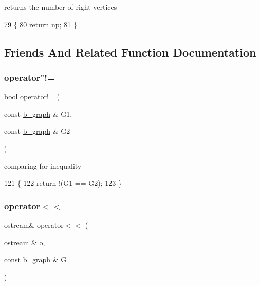 returns the number of right vertices 


\begin{DoxyCode}
79 \{
80   \textcolor{keywordflow}{return} \hyperlink{classb__graph_acffdd5f20329515eb6ec17ad24f1ca64}{np};
81 \}
\end{DoxyCode}


\subsection{Friends And Related Function Documentation}
\mbox{\label{classb__graph_ab90cd92a2e8f077e4ae18c568bcddd1a}} 
\subsubsection{\texorpdfstring{operator"!=}{operator!=}}
{\footnotesize\ttfamily bool operator!= (\begin{DoxyParamCaption}\item[{const \hyperlink{classb__graph}{b\+\_\+graph} \&}]{G1,  }\item[{const \hyperlink{classb__graph}{b\+\_\+graph} \&}]{G2 }\end{DoxyParamCaption})\hspace{0.3cm}{\ttfamily [friend]}}



comparing for inequality 


\begin{DoxyCode}
121 \{
122   \textcolor{keywordflow}{return} !(G1 == G2);
123 \}
\end{DoxyCode}
\mbox{\label{classb__graph_a0635d59bf5b2d1df3d3dd2beef14ac6e}} 
\subsubsection{\texorpdfstring{operator$<$$<$}{operator<<}}
{\footnotesize\ttfamily ostream\& operator$<$$<$ (\begin{DoxyParamCaption}\item[{ostream \&}]{o,  }\item[{const \hyperlink{classb__graph}{b\+\_\+graph} \&}]{G }\end{DoxyParamCaption})\hspace{0.3cm}{\ttfamily [friend]}}



